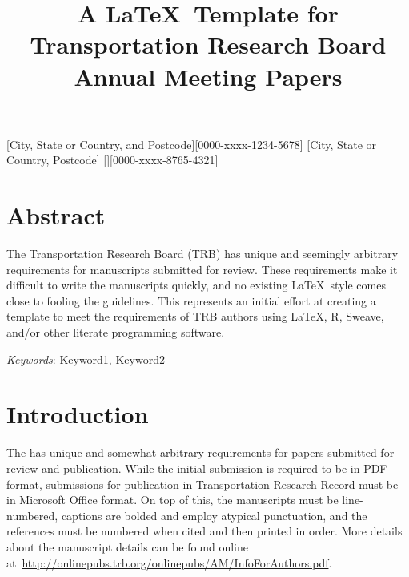 \documentclass[numbered]{trbunofficial2}
\begin{document}
\title{A \LaTeX\ Template for Transportation Research Board Annual Meeting Papers}

[City, State or Country, and Postcode][0000-xxxx-1234-5678]
[City, State or Country, Postcode]
[][0000-xxxx-8765-4321]



\maketitle

\section{Abstract}
The Transportation Research Board (TRB) has unique and seemingly arbitrary requirements for manuscripts submitted for review. These requirements make it difficult to write the manuscripts quickly, and no existing \LaTeX\ style comes close to fooling the guidelines. This represents an initial effort at creating a template to meet the requirements of TRB authors using \LaTeX, R, Sweave, and/or other literate programming software.

\hfill\break%
\noindent\textit{Keywords}: Keyword1, Keyword2
\newpage

\section{Introduction}
The \citep{TRBGuide} has unique and somewhat arbitrary requirements for papers submitted for review and publication. While the initial submission is required to be in PDF format, submissions for publication in Transportation Research Record must be in Microsoft Office format. On top of this, the manuscripts must be line-numbered, captions are bolded and employ atypical punctuation, and the references must be numbered when cited and then printed in order. More details about the manuscript details can be found online at~\url{http://onlinepubs.trb.org/onlinepubs/AM/InfoForAuthors.pdf}.
\end{document}
